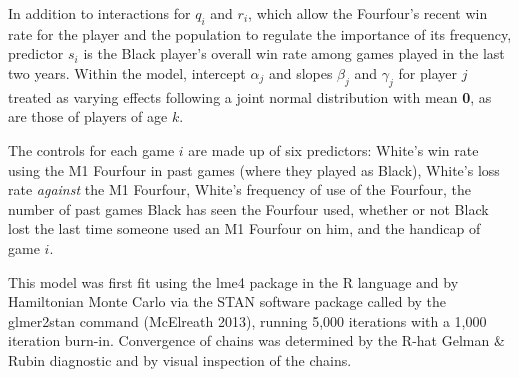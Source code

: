 \documentclass[reqno,12pt]{amsart}
\begin{document}
In addition to interactions for \(q_i\) and \(r_i\), which allow the
Fourfour's recent win rate for the player and the population to regulate
the importance of its frequency, predictor \(s_i\) is the Black player's
overall win rate among games played in the last two years. Within the
model, intercept \(\alpha_j\) and slopes \(\beta_j\) and \(\gamma_j\)
for player \(j\) treated as varying effects following a joint normal
distribution with mean \textbf{0}, as are those of players of age \(k\).

The controls for each game \(i\) are made up of six predictors: White's
win rate using the M1 Fourfour in past games (where they played as
Black), White's loss rate \textit{against} the M1 Fourfour, White's
frequency of use of the Fourfour, the number of past games Black has
seen the Fourfour used, whether or not Black lost the last time someone
used an M1 Fourfour on him, and the handicap of game \(i\).

This model was first fit using the lme4 package in the R language and by
Hamiltonian Monte Carlo via the STAN software package called by the
glmer2stan command (McElreath 2013), running 5,000 iterations with a
1,000 iteration burn-in. Convergence of chains was determined by the
R-hat Gelman \& Rubin diagnostic \citep{stan2013stan} and by visual
inspection of the chains.
\end{document}
